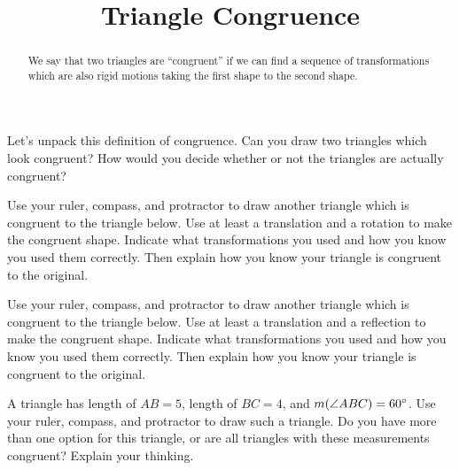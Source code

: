 \documentclass{ximera}
\title{Triangle Congruence}
\begin{document}
\begin{abstract} We say that two triangles are ``congruent'' if we can find a sequence of transformations which are also rigid motions taking the first shape to the second shape. \end{abstract}
\maketitle

\begin{problem}
Let's unpack this definition of congruence. Can you draw two triangles which look congruent? How would you decide whether or not the triangles are actually congruent?
\end{problem}

\begin{problem}
Use your ruler, compass, and protractor to draw another triangle which is congruent to the triangle below. Use at least a translation and a rotation to make the congruent shape. Indicate what transformations you used and how you know you used them correctly. Then explain how you know your triangle is congruent to the original.
\begin{center}
\end{center}
\end{problem}


\begin{problem}
Use your ruler, compass, and protractor to draw another triangle which is congruent to the triangle below. Use at least a translation and a reflection to make the congruent shape. Indicate what transformations you used and how you know you used them correctly. Then explain how you know your triangle is congruent to the original.
\begin{center}
\end{center}
\end{problem}

\newpage

\begin{problem}
A triangle has length of $AB = 5$, length of $BC = 4$, and $m(\angle ABC) = 60\degree$. Use your ruler, compass, and protractor to draw such a triangle. Do you have more than one option for this triangle, or are all triangles with these measurements congruent? Explain your thinking.
\end{problem}
\end{document}
